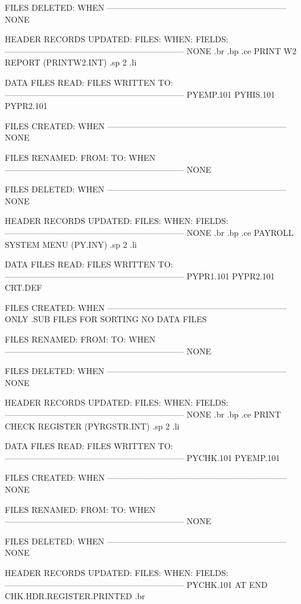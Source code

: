 FILES DELETED:			  WHEN
-----------------------------------------------------------------
       NONE


HEADER RECORDS UPDATED:
FILES:		 WHEN:		    FIELDS:
-----------------------------------------------------------------
      NONE
.br
.bp
.ce
PRINT W2 REPORT  (PRINTW2.INT)
.sp 2
.li

DATA FILES READ:		   FILES WRITTEN TO:
-----------------------------------------------------------------
       PYEMP.101
       PYHIS.101			PYPR2.101

FILES CREATED:			  WHEN
-----------------------------------------------------------------
       NONE


FILES RENAMED:
  FROM:        TO:		  WHEN
-----------------------------------------------------------------
       NONE


FILES DELETED:			  WHEN
-----------------------------------------------------------------
       NONE


HEADER RECORDS UPDATED:
FILES:		 WHEN:		    FIELDS:
-----------------------------------------------------------------
      NONE
.br
.bp
.ce
PAYROLL SYSTEM MENU  (PY.INY)
.sp 2
.li

DATA FILES READ:		   FILES WRITTEN TO:
-----------------------------------------------------------------
       PYPR1.101
       PYPR2.101
       CRT.DEF

FILES CREATED:			  WHEN
-----------------------------------------------------------------
       ONLY .SUB FILES FOR SORTING
       NO DATA FILES


FILES RENAMED:
  FROM:        TO:		  WHEN
-----------------------------------------------------------------
       NONE


FILES DELETED:			  WHEN
-----------------------------------------------------------------
       NONE


HEADER RECORDS UPDATED:
FILES:		 WHEN:		    FIELDS:
-----------------------------------------------------------------
       NONE
.br
.bp
.ce
PRINT CHECK REGISTER  (PYRGSTR.INT)
.sp 2
.li

DATA FILES READ:		   FILES WRITTEN TO:
-----------------------------------------------------------------
       PYCHK.101
       PYEMP.101

FILES CREATED:			  WHEN
-----------------------------------------------------------------
       NONE


FILES RENAMED:
  FROM:        TO:		  WHEN
-----------------------------------------------------------------
       NONE


FILES DELETED:			  WHEN
-----------------------------------------------------------------
       NONE


HEADER RECORDS UPDATED:
FILES:		 WHEN:		    FIELDS:
-----------------------------------------------------------------
      PYCHK.101  AT END 	 CHK.HDR.REGISTER.PRINTED%
.br
